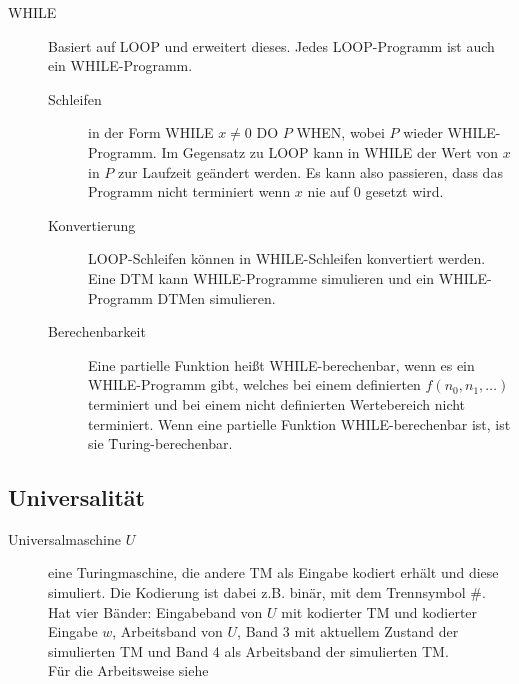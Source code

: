 \begin{description}
        \item[WHILE] Basiert auf LOOP und erweitert dieses. Jedes LOOP-Programm ist auch ein WHILE-Programm.
            \begin{description}
                \item[Schleifen] in der Form WHILE $x \neq 0$ DO $P$ WHEN, wobei $P$ wieder WHILE-Programm. Im Gegensatz zu LOOP kann in WHILE der Wert von $x$ in $P$ zur Laufzeit geändert werden. Es kann also passieren, dass das Programm nicht terminiert wenn $x$ nie auf $0$ gesetzt wird.
                \item[Konvertierung] LOOP-Schleifen können in WHILE-Schleifen konvertiert werden. Eine DTM kann WHILE-Programme simulieren und ein WHILE-Programm DTMen simulieren.
                \item[Berechenbarkeit] Eine partielle Funktion heißt WHILE-berechenbar, wenn es ein WHILE-Programm gibt, welches bei einem definierten $f(n_0,n_1,…)$ terminiert und bei einem nicht definierten Wertebereich nicht terminiert. Wenn eine partielle Funktion WHILE-berechenbar ist, ist sie \f{Turing-berechenbar}.
            \end{description}
    \end{description}

\subsection{Universalität}
    \begin{description}
        \item[Universalmaschine $U$] eine Turingmaschine, die andere TM als Eingabe kodiert erhält und diese simuliert. Die Kodierung ist dabei z.B. binär, mit dem Trennsymbol $\#$. Hat vier Bänder: Eingabeband von $U$ mit kodierter TM und kodierter Eingabe $w$, Arbeitsband von $U$, Band 3 mit aktuellem Zustand der simulierten TM und Band 4 als Arbeitsband der simulierten TM. \\ Für die Arbeitsweise siehe 
    \end{description}

